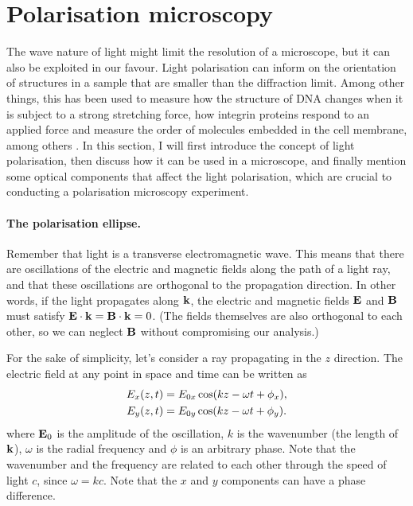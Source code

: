 \section{Polarisation microscopy}

The wave nature of light might limit the resolution of a microscope, but it can also be exploited in our favour. Light polarisation can inform on the orientation of structures in a sample that are smaller than the diffraction limit. Among other things, this has been used to measure how the structure of DNA changes when it is subject to a strong stretching force, how integrin proteins respond to an applied force and measure the order of molecules embedded in the cell membrane, among others \cite{Backer2019, Nordenfelt2017, Swaminathan2017, Brasselet2013}. In this section, I will first introduce the concept of light polarisation, then discuss how it can be used in a microscope, and finally mention some optical components that affect the light polarisation, which are crucial to conducting a polarisation microscopy experiment.

\paragraph{The polarisation ellipse.} Remember that light is a transverse electromagnetic wave. This means that there are oscillations of the electric and magnetic fields along the path of a light ray, and that these oscillations are orthogonal to the propagation direction. In other words, if the light propagates along $\vb{k}$, the electric and magnetic fields $\vb{E}$ and $\vb{B}$ must satisfy $ \vb{E} \cdot \vb{k} = \vb{B} \cdot \vb{k} = 0$. (The fields themselves are also orthogonal to each other, so we can neglect $ \vb{B} $ without compromising our analysis.)

For the sake of simplicity, let's consider a ray propagating in the $ z $ direction. The electric field at any point in space and time can be written as
\begin{align}
	E_x(z, t) &= E_{0x} \cos(kz-\omega t + \phi_x),\\
	E_y(z, t) &= E_{0y} \cos(kz-\omega t + \phi_y).
\end{align}
where $ \vb{E}_0 $ is the amplitude of the oscillation, $ k $ is the wavenumber (the length of $ \vb{k} $), $ \omega $ is the radial frequency and $ \phi $ is an arbitrary phase. Note that the wavenumber and the frequency are related to each other through the speed of light $ c $, since $ \omega = kc$. Note that the $ x $ and $ y $ components can have a phase difference.

